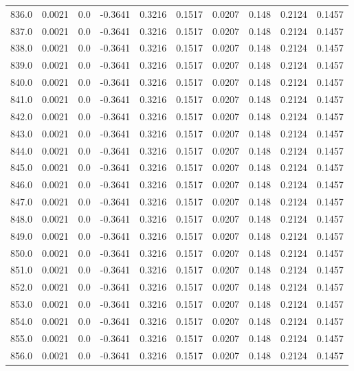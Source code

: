 \begin{longtable}{lrrrrrrrrr}
836.0 & 0.0021 & 0.0 & -0.3641 & 0.3216 & 0.1517 & 0.0207 & 0.148 & 0.2124 & 0.1457 \\
837.0 & 0.0021 & 0.0 & -0.3641 & 0.3216 & 0.1517 & 0.0207 & 0.148 & 0.2124 & 0.1457 \\
838.0 & 0.0021 & 0.0 & -0.3641 & 0.3216 & 0.1517 & 0.0207 & 0.148 & 0.2124 & 0.1457 \\
839.0 & 0.0021 & 0.0 & -0.3641 & 0.3216 & 0.1517 & 0.0207 & 0.148 & 0.2124 & 0.1457 \\
840.0 & 0.0021 & 0.0 & -0.3641 & 0.3216 & 0.1517 & 0.0207 & 0.148 & 0.2124 & 0.1457 \\
841.0 & 0.0021 & 0.0 & -0.3641 & 0.3216 & 0.1517 & 0.0207 & 0.148 & 0.2124 & 0.1457 \\
842.0 & 0.0021 & 0.0 & -0.3641 & 0.3216 & 0.1517 & 0.0207 & 0.148 & 0.2124 & 0.1457 \\
843.0 & 0.0021 & 0.0 & -0.3641 & 0.3216 & 0.1517 & 0.0207 & 0.148 & 0.2124 & 0.1457 \\
844.0 & 0.0021 & 0.0 & -0.3641 & 0.3216 & 0.1517 & 0.0207 & 0.148 & 0.2124 & 0.1457 \\
845.0 & 0.0021 & 0.0 & -0.3641 & 0.3216 & 0.1517 & 0.0207 & 0.148 & 0.2124 & 0.1457 \\
846.0 & 0.0021 & 0.0 & -0.3641 & 0.3216 & 0.1517 & 0.0207 & 0.148 & 0.2124 & 0.1457 \\
847.0 & 0.0021 & 0.0 & -0.3641 & 0.3216 & 0.1517 & 0.0207 & 0.148 & 0.2124 & 0.1457 \\
848.0 & 0.0021 & 0.0 & -0.3641 & 0.3216 & 0.1517 & 0.0207 & 0.148 & 0.2124 & 0.1457 \\
849.0 & 0.0021 & 0.0 & -0.3641 & 0.3216 & 0.1517 & 0.0207 & 0.148 & 0.2124 & 0.1457 \\
850.0 & 0.0021 & 0.0 & -0.3641 & 0.3216 & 0.1517 & 0.0207 & 0.148 & 0.2124 & 0.1457 \\
851.0 & 0.0021 & 0.0 & -0.3641 & 0.3216 & 0.1517 & 0.0207 & 0.148 & 0.2124 & 0.1457 \\
852.0 & 0.0021 & 0.0 & -0.3641 & 0.3216 & 0.1517 & 0.0207 & 0.148 & 0.2124 & 0.1457 \\
853.0 & 0.0021 & 0.0 & -0.3641 & 0.3216 & 0.1517 & 0.0207 & 0.148 & 0.2124 & 0.1457 \\
854.0 & 0.0021 & 0.0 & -0.3641 & 0.3216 & 0.1517 & 0.0207 & 0.148 & 0.2124 & 0.1457 \\
855.0 & 0.0021 & 0.0 & -0.3641 & 0.3216 & 0.1517 & 0.0207 & 0.148 & 0.2124 & 0.1457 \\
856.0 & 0.0021 & 0.0 & -0.3641 & 0.3216 & 0.1517 & 0.0207 & 0.148 & 0.2124 & 0.1457 \\

\end{longtable}
